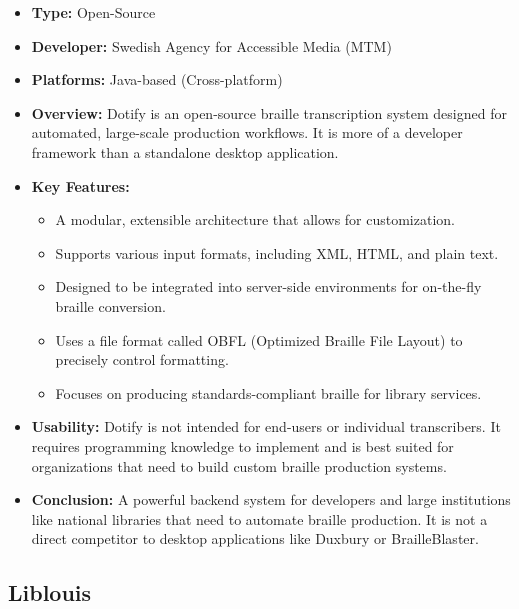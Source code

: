 \begin{itemize}
	\item \textbf{Type:} Open-Source
	\item \textbf{Developer:} Swedish Agency for Accessible Media (MTM)
	\item \textbf{Platforms:} Java-based (Cross-platform)
	\item \textbf{Overview:} Dotify \supercite{Dotify} is an open-source braille transcription system designed for automated, large-scale production workflows. It is more of a developer framework than a standalone desktop application.
	\item \textbf{Key Features:}
	      \begin{itemize}
		      \item A modular, extensible architecture that allows for customization.
		      \item Supports various input formats, including XML, HTML, and plain text.
		      \item Designed to be integrated into server-side environments for on-the-fly braille conversion.
		      \item Uses a file format called OBFL (Optimized Braille File Layout) to precisely control formatting.
		      \item Focuses on producing standards-compliant braille for library services.
	      \end{itemize}
	\item \textbf{Usability:} Dotify is not intended for end-users or individual transcribers. It requires programming knowledge to implement and is best suited for organizations that need to build custom braille production systems.
	\item \textbf{Conclusion:} A powerful backend system for developers and large institutions like national libraries that need to automate braille production. It is not a direct competitor to desktop applications like Duxbury or BrailleBlaster.
\end{itemize}

\subsection{Liblouis}
\label{sub:liblouis}

